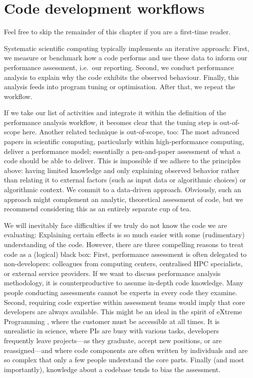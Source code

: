 \section{Code development workflows}

\begin{readerguide}
 Feel free to skip the remainder of this chapter if you are a first-time reader. 
\end{readerguide}


\noindent
Systematic scientific computing typically implements an iterative approach:
First, we measure or benchmark how a code performs and use these data to inform our performance assessment, i.e.~our reporting.
Second, we conduct performance analysis to explain why the code exhibits the observed behaviour.
Finally, this analysis feeds into program tuning or optimisation.
After that, we repeat the workflow.



If we take our list of activities and integrate it within the definition of the performance analysis workflow, it becomes clear that the tuning step is out-of-scope here.
Another related technique is out-of-scope, too:
The most advanced papers in scientific computing, particularly within high-performance computing, deliver a performance model;
essentially a pen-and-paper assessment of what a code should be able to deliver.
This is impossible if we adhere to the principles above: having limited
knowledge and only explaining observed behavior rather than relating it to
external factors (such as input data or algorithmic choices) or algorithmic
context.
We commit to a data-driven approach.
Obviously, such an approach might complement an analytic, theoretical assessment
of code, but we recommend considering this as an entirely separate cup of tea.



We will inevitably face difficulties if we truly do not know the code we are evaluating:
Explaining certain effects is so much easier with some (rudimentary)
understanding of the code.
However, there are three compelling reasons to treat code as a (logical) black box:
First, performance assessment is often delegated to non-developers: colleagues
from computing centers, centralised HPC specialists, or external service providers.
If we want to discuss performance analysis methodology, it is counterproductive to assume in-depth code knowledge.
Many people conducting assessments cannot be experts in every code they examine.
Second, requiring code expertise within assessment teams would imply that core developers are always available.
This might be an ideal in the spirit of eXtreme Programming \cite{beck1999}, where
the customer must be accessible at all times.
It is unrealistic in science, where PIs are busy with various tasks, developers
frequently leave projects---as they graduate, accept new positions, or are
reassigned---and where code components are often written by individuals and are
so complex that only a few people understand the core parts.
Finally (and most importantly), knowledge about a codebase tends to bias the assessment.




